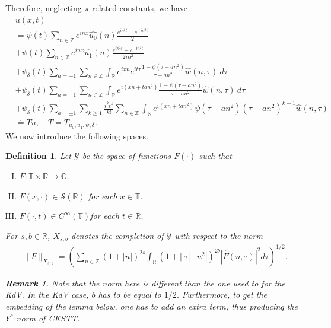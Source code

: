 \documentclass[12pt,reqno]{amsart}
\numberwithin{equation}{section}  %
\newcommand{\rr}{\mathbb{R}}
\newcommand{\zz}{\mathbb{Z}}
\newcommand{\cc}{\mathbb{C}}
\newcommand{\ci}{\mathbb{T}}
\newcommand{\wh}{\widehat}
\newtheorem{definition}[theorem]{Definition}
\newtheorem{remark}[theorem]{Remark}
\begin{document}
%
%
Therefore, neglecting $\pi$ related constants, we have
%
%
%
\begin{align}
  & u(x,t)
  \label{main1-rel-term-0}
  \\
  \label{main1-rel-term-1}
  & = \psi(t) \sum_{n \in \zz} e^{inx} \wh{u_{0}}(n) \frac{e^{in^{2}t} + e^{-in^{2}t}}{2} 
  \\
  \label{main1-rel-term-2}
  & + \psi(t) \sum_{n \in \zz} e^{inx}
  \wh{u_{1}}(n)\frac{e^{in^{2}t} - e^{-in^{2}t}}{2 i n^{2}} 
  \\
  \label{main1-rel-term-3}
  & +  \psi_{\delta}(t)\sum_{a = \pm 1} \sum_{n\in \zz} \int_\rr e^{ixn}  
  e^{it \tau} \frac{1 - \psi(\tau -  an^{2}) 
}{\tau -  an^{2}} \wh{w}(n, \tau) \ d \tau
  \\
  \label{main1-rel-term-4}
  & + \psi_{\delta}(t) \sum_{a = \pm 1} \sum_{n\in \zz} \int_\rr e^{i(xn + 
  t an^{2})}
  \frac{1- \psi(\tau -  an^{2})}{\tau -  an^{2}} \wh{w}(n, \tau) \ d \tau
  \\
  \label{main1-rel-term-4.5}
  & +  \psi_{\delta}(t) \sum_{a = \pm 1}  \sum_{k \ge 1} \frac{i^k t^k}{k!}
  \sum_{n \in \zz} \int_\rr e^{i(xn + t an^{2} )}
  \psi(\tau -  an^{2}) (\tau -  an^{2})^{k-1} \wh{w}(n, \tau)
  \\
  \label{main1-rel-term-5}
  & \doteq Tu, \quad T=T_{u_0, u_1, \psi, \delta}.
\end{align}
%
%
%
%
%
%
%
%
%
%
%
%
We now introduce the following spaces. 
%
%
\begin{definition}
  Let $\mathcal{Y}$ be the space of functions $F(\cdot)$ such that
  \begin{enumerate}[(I)]
   \item{$F: \ci \times \rr \to \cc$}.
   \item{$F(x, \cdot) \in \mathcal{S}(\rr)$ for each $x \in \ci$}.
   \item{$F(\cdot, t) \in C^{\infty}(\ci)$for each $t \in \rr$}.
  \end{enumerate}
  For $s, b \in \rr$, $X_{s,b}$ denotes the completion of $\mathcal{Y}$ with
  respect to the norm
  \begin{equation}
  \begin{split}
    \|F\|_{X_{s,b}} = \left( \sum_{n \in \zz} (1 + |n|)^{2s} \int_{\rr}
    (1 + | | \tau | - n^{2} |)^{2b} |\wh{F}(n, \tau)|^{2} d \tau\right)^{1/2}.
  \end{split}
  \label{eqn:bous-norm}
  \end{equation}
  \begin{framed}
    \begin{remark}
    Note that the norm here is different than the one used to for the KdV. In
    the KdV case, $b$ has to be equal to $1/2$. Furthermore, to get the embedding
    of the lemma below, one has to add an extra term, thus producing the
    $Y^{s}$ norm of CKSTT\@.
    \label{rem:alternate-space}
    \end{remark}
  \end{framed}
\end{definition}
\end{document}
